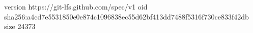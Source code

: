 version https://git-lfs.github.com/spec/v1
oid sha256:a4cd7e5531850e0e874c1096838ec55d62bf413dd7488f5316f730ce833f42db
size 24373
